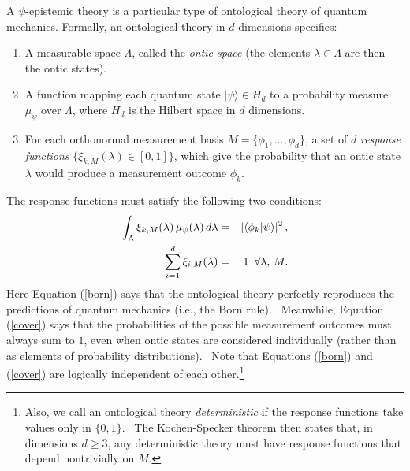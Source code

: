 \documentclass[letterpaper,12pt]{article}
\newcommand{\ba}{\begin{eqnarray}}
\newcommand{\ea}{\end{eqnarray}}
\newcommand{\braket}[2]{\mbox{$ \langle #1 | #2 \rangle $}}
\begin{document}
A $\psi$-epistemic theory is a particular type of ontological theory of quantum mechanics. Formally, an ontological theory in $d$ dimensions specifies:

\begin{enumerate}
\item A measurable space $\Lambda$, called the \emph{ontic space} (the
elements $\lambda \in \Lambda$ are then the ontic states).

\item A function mapping each quantum state $ | \psi \rangle \in H_d
$ to a probability measure $\mu_\psi$ over $\Lambda$, where $H_d$ is the
Hilbert space in $d$ dimensions.

\item For each orthonormal measurement basis $M=\{\phi_1,\ldots,\phi_d\}$, a
set of $d$ \emph{response functions} $\{\xi_{k,M}(\lambda) \in [0,1]\}$,
which give the probability that an ontic state $\lambda$ would produce a
measurement outcome $\phi_k$.
\end{enumerate}

The response functions
must satisfy the following two conditions:
\ba \int_\Lambda \xi_{k,M}(\lambda)\,\mu_\psi(\lambda)\,d\lambda &=& |\braket{\phi_k}{\psi}|^2\,, \label{born} \\
\sum_{i=1}^{d} \xi_{i,M}(\lambda) &=& 1\,\,\, \forall \lambda,\, M. \label{cover} \ea
Here Equation (\ref{born}) says that the ontological theory perfectly reproduces the predictions of quantum
mechanics (i.e., the Born rule). \ Meanwhile, Equation (\ref{cover}) says that the probabilities of the
possible measurement outcomes must always sum to $1$, even when ontic states
are considered individually (rather than as elements of probability
distributions). \ Note that Equations (\ref{born}) and (\ref{cover}) are
logically independent of each other.\footnote{Also, we call an ontological theory \textit{deterministic} if the response functions take values
only in $\{0,1\}$. \ The Kochen-Specker theorem then states that, in
dimensions $d \geq 3$, any deterministic theory must have response functions
that depend nontrivially on $M$.}
\end{document}

